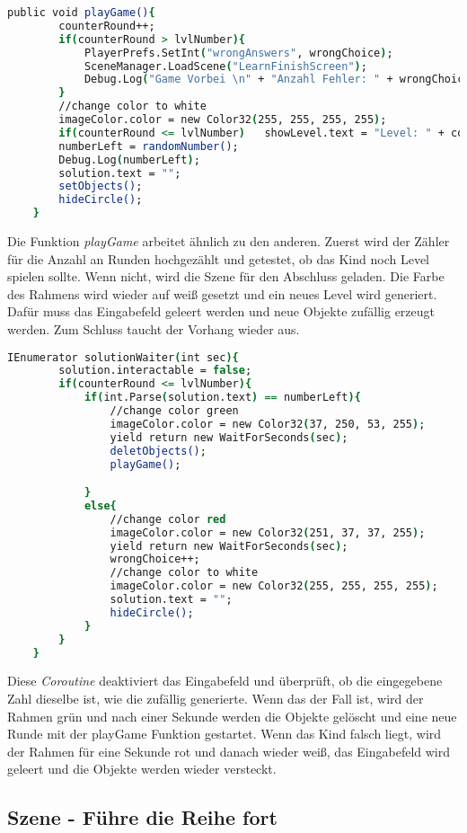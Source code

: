 \begin{lstlisting}[language=csh, caption={hideCircle.cs playGame-Funktion}]
	public void playGame(){
		counterRound++;
		if(counterRound > lvlNumber){
			PlayerPrefs.SetInt("wrongAnswers", wrongChoice);
			SceneManager.LoadScene("LearnFinishScreen");
			Debug.Log("Game Vorbei \n" + "Anzahl Fehler: " + wrongChoice);
		}
		//change color to white
		imageColor.color = new Color32(255, 255, 255, 255);
		if(counterRound <= lvlNumber)	showLevel.text = "Level: " + counterRound + "/" + lvlNumber;
		numberLeft = randomNumber();
		Debug.Log(numberLeft);
		solution.text = "";
		setObjects();
		hideCircle();
	}
\end{lstlisting}
Die Funktion \textit{playGame} arbeitet ähnlich zu den anderen. Zuerst wird der Zähler für die Anzahl an Runden hochgezählt und getestet, ob das Kind noch Level spielen sollte. Wenn nicht, wird die Szene für den Abschluss geladen. Die Farbe des Rahmens wird wieder auf weiß gesetzt und ein neues Level wird generiert. Dafür muss das Eingabefeld geleert werden und neue Objekte zufällig erzeugt werden. Zum Schluss taucht der Vorhang wieder aus.\\
\begin{lstlisting}[language=csh, caption={hideCircle.cs solutionWaiter-Funktion}]
	IEnumerator solutionWaiter(int sec){
		solution.interactable = false;
		if(counterRound <= lvlNumber){
			if(int.Parse(solution.text) == numberLeft){
				//change color green
				imageColor.color = new Color32(37, 250, 53, 255);
				yield return new WaitForSeconds(sec);
				deletObjects();
				playGame();

			}
			else{
				//change color red
				imageColor.color = new Color32(251, 37, 37, 255);
				yield return new WaitForSeconds(sec);
				wrongChoice++;
				//change color to white
				imageColor.color = new Color32(255, 255, 255, 255);
				solution.text = "";
				hideCircle();
			}
		}
	}
\end{lstlisting}
Diese \textit{Coroutine} deaktiviert das Eingabefeld und überprüft, ob die eingegebene Zahl dieselbe ist, wie die zufällig generierte. Wenn das der Fall ist, wird der Rahmen grün und nach einer Sekunde werden die Objekte gelöscht und eine neue Runde mit der playGame Funktion gestartet. Wenn das Kind falsch liegt, wird der Rahmen für eine Sekunde rot und danach wieder weiß, das Eingabefeld wird geleert und die Objekte werden wieder versteckt.
\subsection{Szene - Führe die Reihe fort}
